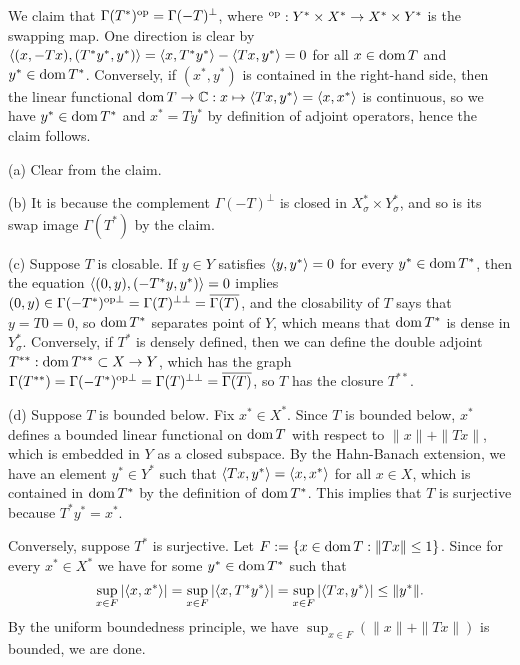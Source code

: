 \documentclass{../../large}
\begin{document}
\begin{pf}

We claim that $\Gamma(T^*)^{\mathrm{op}}=\Gamma(-T)^\perp$, where $^{\mathrm{op}}:Y^*\times X^*\to X^*\times Y^*$ is the swapping map.
One direction is clear by $\langle(x,-Tx),(T^*y^*,y^*)\rangle=\langle x,T^*y^*\rangle-\langle Tx,y^*\rangle=0$ for all $x\in\operatorname{dom} T$ and $y^*\in\operatorname{dom} T^*$.
Conversely, if $(x^*,y^*)$ is contained in the right-hand side, then the linear functional $\operatorname{dom} T\to\mathbb{C}:x\mapsto\langle Tx,y^*\rangle=\langle x,x^*\rangle$ is continuous, so we have $y^*\in\operatorname{dom} T^*$ and $x^*=Ty^*$ by definition of adjoint operators, hence the claim follows.

(a) Clear from the claim.

(b) It is because the complement $\Gamma(-T)^\perp$ is closed in $X^*_\sigma\times Y^*_\sigma$, and so is its swap image $\Gamma(T^*)$ by the claim.

(c)
Suppose $T$ is closable.
If $y\in Y$ satisfies $\langle y,y^*\rangle=0$ for every $y^*\in\operatorname{dom} T^*$, then the equation $\langle(0,y),(-T^*y,y^*)\rangle=0$ implies $(0,y)\in\Gamma(-T^*)^{\mathrm{op}\perp}=\Gamma(T)^{\perp\perp}=\overline{\Gamma(T)}$, and the closability of $T$ says that $y=T0=0$, so $\operatorname{dom} T^*$ separates point of $Y$, which means that $\operatorname{dom} T^*$ is dense in $Y^*_\sigma$.
Conversely, if $T^*$ is densely defined, then we can define the double adjoint $T^{**}:\operatorname{dom} T^{**}\subset X\to Y$, which has the graph $\Gamma(T^{**})=\Gamma(-T^*)^{\mathrm{op}\perp}=\Gamma(T)^{\perp\perp}=\overline{\Gamma(T)}$, so $T$ has the closure $T^{**}$.

(d)
Suppose $T$ is bounded below.
Fix $x^*\in X^*$.
Since $T$ is bounded below, $x^*$ defines a bounded linear functional on $\operatorname{dom} T$ with respect to $\|x\|+\|Tx\|$, which is embedded in $Y$ as a closed subspace.
By the Hahn-Banach extension, we have an element $y^*\in Y^*$ such that $\langle Tx,y^*\rangle=\langle x,x^*\rangle$ for all $x\in X$, which is contained in $\operatorname{dom} T^*$ by the definition of $\operatorname{dom} T^*$.
This implies that $T$ is surjective because $T^*y^*=x^*$.

Conversely, suppose $T^*$ is surjective.
Let $F:=\{x\in\operatorname{dom} T:\|Tx\|\le1\}$.
Since for every $x^*\in X^*$ we have for some $y^*\in\operatorname{dom} T^*$ such that
\[\sup_{x\in F}|\langle x,x^*\rangle|=\sup_{x\in F}|\langle x,T^*y^*\rangle|=\sup_{x\in F}|\langle Tx,y^*\rangle|\le\|y^*\|.\]
By the uniform boundedness principle, we have $\sup_{x\in F}(\|x\|+\|Tx\|)$ is bounded, we are done.
\end{pf}

\begin{prb}[Cores]
\end{prb}
\end{document}

